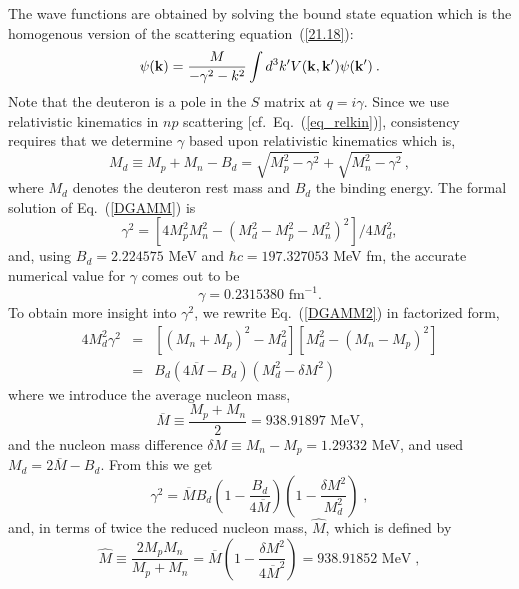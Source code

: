 The wave functions are obtained by solving
the bound state equation which is the homogenous version
of the scattering equation~(\ref{21.18}):
\begin{equation}
\psi({\bf k}) = \frac{M}{-\gamma^2 - k^2} \int d^3k' V({\bf k},
{\bf k}') \psi({\bf k}')
\: .
\label{eq_bound}
\end{equation}
Note that the deuteron is a pole in the $S$ matrix at $q=i\gamma$.
Since we use relativistic kinematics in $np$ scattering [cf.\
Eq.~(\ref{eq_relkin})],
consistency requires that we determine $\gamma$ based upon
relativistic kinematics which is,
\begin{equation}
   M_d \equiv M_p + M_n - B_d = \sqrt{M_p^2-\gamma^2} +
            \sqrt{M_n^2-\gamma^2}  
\, ,
\label{DGAMM}
\end{equation}
where $M_d$ denotes the deuteron rest mass
and $B_d$ the binding energy.
The formal solution of Eq.~(\ref{DGAMM}) is
\begin{equation}
   \gamma^2 = \left[4M_p^2 M_n^2 - (M_d^2-M_p^2-M_n^2)^2\right]/4M_d^2,
\label{DGAMM2}
\end{equation}
and, using $B_d=2.224575$ MeV and $\hbar c = 197.327053$ MeV fm,
the accurate numerical value for $\gamma$ comes out to be
\begin{equation}
   \gamma = 0.2315380 \mbox{ fm}^{-1}.  \label{DGAMMA}
\end{equation}
To obtain more insight into $\gamma^2$,
we rewrite Eq.~(\ref{DGAMM2}) in factorized form,
\begin{eqnarray}
4M_d^2\gamma^2 &=& \left[ (M_n+M_p)^2 - M_d^2 \right]
                 \left[ M_d^2 - (M_n-M_p)^2 \right] \nonumber\\
               &=& B_d (4\overline{M}-B_d)(M_d^2-\delta M^2)
\end{eqnarray}
where we introduce the average nucleon mass,
\begin{equation}
\overline{M} \equiv \frac{M_p + M_n}{2} = 938.91897 \mbox{ MeV,}
\end{equation}
and the nucleon mass difference
$\delta M \equiv M_n-M_p=1.29332$ MeV, and used
$M_d=2\overline{M}-B_d$.
From this we get
\begin{equation}
\gamma^2 = \overline{M}B_d \left( 1 - \frac{B_d}{4\overline{M}} \right)
                \left( 1 - \frac{\delta M^2}{M_d^2} \right) \; ,
\end {equation}
and, in terms of twice the reduced nucleon mass, 
$\widehat{M}$, which is defined by
\begin{equation}
   \widehat{M} \equiv \frac{2 M_p M_n}{M_p + M_n}
 = \overline{M}
\left( 1 -\frac{\delta M^2}{4\overline{M}^2} \right) 
 = 938.91852 \mbox{ MeV}
\; ,
\end{equation}
